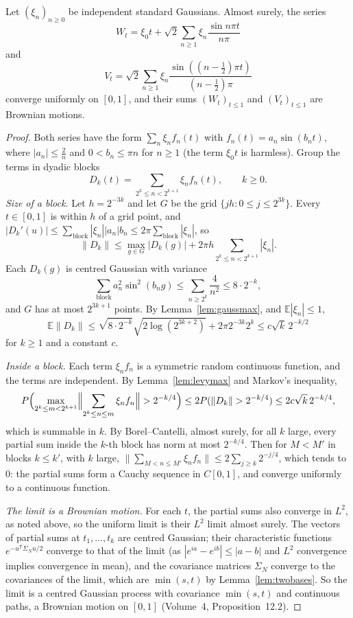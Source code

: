 \begin{theorem}\label{thm:wienerseries}
Let $(\xi_n)_{n\ge0}$ be independent standard Gaussians. Almost surely, the series
\[
W_t=\xi_0t+\sqrt2\sum_{n\ge1}\xi_n\frac{\sin n\pi t}{n\pi}
\]
and
\[
V_t=\sqrt2\sum_{n\ge1}\xi_n\frac{\sin((n-\frac12)\pi t)}{(n-\frac12)\pi}
\]
converge uniformly on $[0,1]$, and their sums $(W_t)_{t\le1}$ and $(V_t)_{t\le1}$ are Brownian motions.
\end{theorem}

\begin{proof}
Both series have the form $\sum_n\xi_nf_n(t)$ with $f_n(t)=a_n\sin(b_nt)$, where $|a_n|\le\frac2{n}$ and $0<b_n\le\pi n$ for $n\ge1$ (the term $\xi_0t$ is harmless). Group the terms in dyadic blocks
\[
D_k(t)=\sum_{2^k\le n<2^{k+1}}\xi_nf_n(t),\qquad k\ge0.
\]
\emph{Size of a block.} Let $h=2^{-3k}$ and let $G$ be the grid $\{jh:0\le j\le2^{3k}\}$. Every $t\in[0,1]$ is within $h$ of a grid point, and $|D_k'(u)|\le\sum_{\text{block}}|\xi_n||a_n|b_n\le2\pi\sum_{\text{block}}|\xi_n|$, so
\[
\|D_k\|\le\max_{g\in G}|D_k(g)|+2\pi h\sum_{2^k\le n<2^{k+1}}|\xi_n|.
\]
Each $D_k(g)$ is centred Gaussian with variance
\[\textstyle\sum_{\text{block}}a_n^2\sin^2(b_ng)\le\sum_{n\ge2^k}\frac4{n^2}\le8\cdot2^{-k},\]
and $G$ has at most $2^{3k+1}$ points. By Lemma~\ref{lem:gaussmax}, and $\mathbb E|\xi_n|\le1$,
\[
\mathbb E\|D_k\|\le\sqrt{8\cdot2^{-k}}\sqrt{2\log(2^{3k+2})}+2\pi2^{-3k}2^k\le c\sqrt k\,2^{-k/2}
\]
for $k\ge1$ and a constant $c$.

\emph{Inside a block.} Each term $\xi_nf_n$ is a symmetric random continuous function, and the terms are independent. By Lemma~\ref{lem:levymax} and Markov's inequality,
\[
P\Bigl(\max_{2^k\le m<2^{k+1}}\Bigl\|\sum_{2^k\le n\le m}\xi_nf_n\Bigr\|>2^{-k/4}\Bigr)\le2P(\|D_k\|>2^{-k/4})\le2c\sqrt k\,2^{-k/4},
\]
which is summable in $k$. By Borel--Cantelli, almost surely, for all $k$ large, every partial sum inside the $k$-th block has norm at most $2^{-k/4}$. Then for $M<M'$ in blocks $k\le k'$, with $k$ large,
$\bigl\|\sum_{M<n\le M'}\xi_nf_n\bigr\|\le2\sum_{j\ge k}2^{-j/4}$, which tends to $0$: the partial sums form a Cauchy sequence in $C[0,1]$, and converge uniformly to a continuous function.

\emph{The limit is a Brownian motion.} For each $t$, the partial sums also converge in $L^2$, as noted above, so the uniform limit is their $L^2$ limit almost surely. The vectors of partial sums at $t_1,\dots,t_k$ are centred
Gaussian; their characteristic functions $e^{-u^{\mathsf T}\Sigma_Nu/2}$ converge to that of the limit (as $|e^{ia}-e^{ib}|\le|a-b|$ and $L^2$ convergence implies convergence in mean), and the covariance matrices
$\Sigma_N$ converge to the covariances of the limit, which are $\min(s,t)$ by Lemma~\ref{lem:twobases}. So the limit is a centred Gaussian process with covariance $\min(s,t)$ and continuous paths, a Brownian motion
on $[0,1]$ (Volume~4, Proposition~12.2).
\end{proof}

